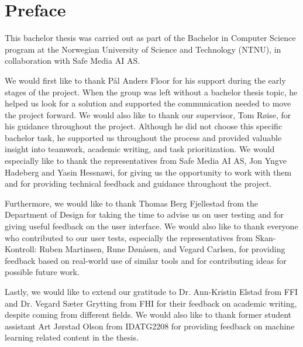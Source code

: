 \chapter*{Preface}

This bachelor thesis was carried out as part of the Bachelor in Computer Science program at the Norwegian University of Science and Technology (NTNU), in collaboration with Safe Media AI AS.

We would first like to thank Pål Anders Floor for his support during the early stages of the project. When the group was left without a bachelor thesis topic, he helped us look for a solution and supported the communication needed to move the project forward. We would also like to thank our supervisor, Tom Røise, for his guidance throughout the project. Although he did not choose this specific bachelor task, he supported us throughout the process and provided valuable insight into teamwork, academic writing, and task prioritization. We would especially like to thank the representatives from Safe Media AI AS, Jon Yngve Hadeberg and Yasin Hessnawi, for giving us the opportunity to work with them and for providing technical feedback and guidance throughout the project.

Furthermore, we would like to thank Thomas Berg Fjellestad from the Department of Design for taking the time to advise us on user testing and for giving useful feedback on the user interface. We would also like to thank everyone who contributed to our user tests, especially the representatives from Skan-Kontroll: Ruben Martinsen, Rune Dønåsen, and Vegard Carlsen, for providing feedback based on real-world use of similar tools and for contributing ideas for possible future work.

Lastly, we would like to extend our gratitude to Dr. Ann-Kristin Elstad from FFI and Dr. Vegard Sæter Grytting from FHI for their feedback on academic writing, despite coming from different fields. We would also like to thank former student assistant Art Jørstad Olson from IDATG2208 for providing feedback on machine learning related content in the thesis.
